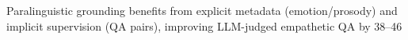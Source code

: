 \documentclass{article}
\begin{document}
Paralinguistic grounding benefits from explicit metadata (emotion/prosody) and implicit supervision (QA pairs), improving LLM-judged empathetic QA by 38--46%
\end{document}
